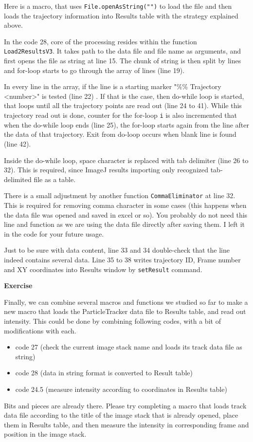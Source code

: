 \documentclass[11pt,a4paper,oneside]{report}
\newenvironment{indentexercise}[1]%
{{\setlength{\leftmargin}{2em}}%
\textbf{Exercise \thesubsection-#1}%
\begin{list}{}%
	\item%
}
{\end{list}}
\newcommand{\ilcom}[1]{\texttt{\small#1}}
\begin{document}
Here is a macro, that uses \ilcom{File.openAsString("")} to load the file and then loads the trajectory information 
into Results table with the strategy explained above. 



In the code 28, core of the processing resides within the function \ilcom{Load2ResultsV3}. 
It takes path to the data file and file name as arguments, and first opens the file as string at line 15. 
The chunk of string is then split by lines and for-loop starts to go through the array of lines (line 19). 

In every line in the array, if the line is a starting marker "\%\% Trajectory <number>" is tested (line 22) . 
If that is the case, then do-while loop is started, that loops until all the trajectory points are read out (line 24 to 41). 
While this trajectory read out is done, counter for the for-loop \ilcom{i} 
is also incremented that when the do-while loop ends (line 25), the for-loop starts again from the 
line after the data of that trajectory. Exit from do-loop occurs when blank line is found (line 42). 

Inside the do-while loop, space character is replaced with tab delimiter (line 26 to 32). 
This is required, since ImageJ results importing only recognized tab-delimited file as a table.  

There is a small adjustment by another function \ilcom{CommaEliminator} at line 32. 
This is required for removing comma character in some cases (this happens when the data file was opened and saved in excel or so). 
You probably do not need this line and function as we are using the data file directly after saving them. I left it in the code for your future usage. 

Just to be sure with data content, line 33 and 34 double-check that the line indeed contains several data. 
Line 35 to 38 writes trajectory ID, Frame number and XY coordinates into Results window by \ilcom{setResult} command.

\begin{indentexercise}{2}
\item Finally, we can combine several macros and functions we studied so far to make a new macro 
that loads the ParticleTracker data file to Results table, and read out intensity. 
This could be done by combining following codes, with a bit of modifications with each. 
\begin{itemize}
\item code 27 (check the current image stack name and loads its track data file as string)
\item code 28 (data in string format is converted to Result table)
\item code 24.5 (measure intensity according to coordinates in Results table)
\end{itemize}
Bits and pieces are already there. Please try completing a macro that loads track data file according 
to the title of the image stack that is already opened, place them in Results table, and then measure 
the intensity in corresponding frame and position in the image stack. 
\end{indentexercise}
\end{document}
